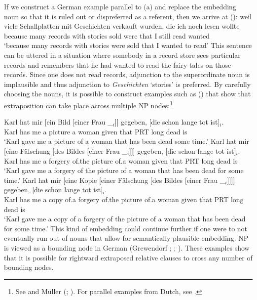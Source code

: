 If we construct a German example parallel to (a) and replace the embedding noun so that it is ruled out or dispreferred as a referent, then we arrive at ():
\ea
\gll weil viele Schallplatten mit Geschichten verkauft wurden, die ich noch lesen wollte\\
	 because many records with stories sold were that I still read wanted\\
\glt `because many records with stories were sold that I wanted to read'
\z
This sentence can be uttered in a situation where somebody in a record store sees particular records and remembers that he had
wanted to read the fairy tales on those records. Since one does not read records, adjunction to the superordinate noun is implausible
and thus adjunction to \emph{Geschichten} `stories' is preferred. By carefully choosing the nouns, it is possible to construct examples such as
() that show that extraposition can take place across multiple NP nodes:\footnote{%
  See  and Müller (\citeyear{Mueller2004d};
  \citeyear[Section~3]{Mueller2007c}). For parallel examples from
  Dutch, see .  
}

\eal
\ex 
\gll Karl hat mir [ein Bild [einer Frau \_$_i$]] gegeben, [die schon lange tot ist]$_i$.\\
	 Karl has me  \spacebr{}a picture  \spacebr{}a woman {} given \spacebr{}that PRT long dead is\\
\glt `Karl gave me a picture of a woman that has been dead some time.'
\ex 
\gll Karl hat mir [eine Fälschung [des Bildes [einer Frau \_$_i$]]] gegeben, [die schon lange tot ist]$_i$.\\
	Karl has me \spacebr{}a forgery \spacebr{}of.the picture \spacebr{}of.a woman {} given \spacebr{}that PRT long dead is\\
\glt `Karl gave me a forgery of the picture of a woman that has been dead for some time.'
\ex 
\gll Karl hat mir [eine Kopie [einer Fälschung [des Bildes [einer Frau \_$_i$]]]] gegeben, [die schon lange tot ist]$_i$.\\
	 Karl has me \spacebr{}a copy \spacebr{}of.a forgery \spacebr{}of.the picture \spacebr{}of.a woman {} given \spacebr{}that PRT long dead is\\
\glt `Karl gave me a copy of a forgery of the picture of a woman that has been dead for some time.'
\zl
This kind of embedding could continue further if one were to not eventually run out of nouns that
allow for semantically plausible embedding.
NP is viewed as a bounding node in German (Grewendorf \citeyear[]{Grewendorf88a};
\citeyear[--18]{Grewendorf2002a}; \citealp[]{Haider2001a}). These examples show that it is possible for rightward extraposed relative clauses
to cross any number of bounding nodes.

